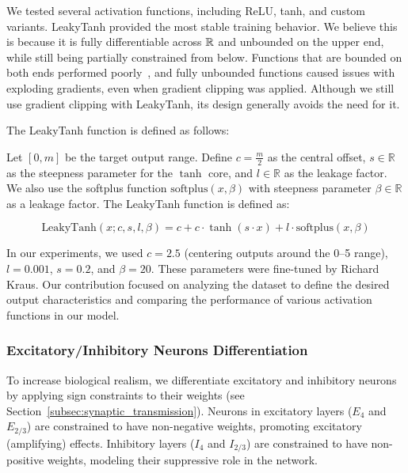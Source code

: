 We tested several activation functions, including ReLU, tanh, and custom variants. LeakyTanh provided the most stable training behavior. We believe this is because it is fully differentiable across $\mathbb{R}$ and unbounded on the upper end, while still being partially constrained from below. Functions that are bounded on both ends performed poorly~\citep{shiv2022activation, nwankpa2018activationfunctionscomparisontrends}, and fully unbounded functions caused issues with exploding gradients, even when gradient clipping was applied. Although we still use gradient clipping with LeakyTanh, its design generally avoids the need for it.

The LeakyTanh function is defined as follows:

\begin{defn}[LeakyTanh]
    Let $[0, m]$ be the target output range. Define $c = \frac{m}{2}$ as the central offset, $s \in \mathbb{R}$ as the steepness parameter for the $\tanh$ core, and $l \in \mathbb{R}$ as the leakage factor. We also use the softplus function $\text{softplus}(x, \beta)$ with steepness parameter $\beta \in \mathbb{R}$ as a leakage factor. The LeakyTanh function is defined as:
    
    $$\text{LeakyTanh}(x; c, s, l, \beta) = c + c \cdot \tanh(s \cdot x) + l \cdot \text{softplus}(x, \beta)$$
\end{defn}
\label{def:leakytanh}

In our experiments, we used $c = 2.5$ (centering outputs around the 0--5 range), $l = 0.001$, $s = 0.2$, and $\beta = 20$. These parameters were fine-tuned by Richard Kraus. Our contribution focused on analyzing the dataset to define the desired output characteristics and comparing the performance of various activation functions in our model.

\subsubsection{Excitatory/Inhibitory Neurons Differentiation}
\label{subsubsec:exc_inh_differentiation}

To increase biological realism, we differentiate excitatory and inhibitory neurons by applying sign constraints to their weights (see Section~\ref{subsec:synaptic_transmission}). Neurons in excitatory layers ($E_4$ and $E_{2/3}$) are constrained to have non-negative weights, promoting excitatory (amplifying) effects. Inhibitory layers ($I_4$ and $I_{2/3}$) are constrained to have non-positive weights, modeling their suppressive role in the network.

